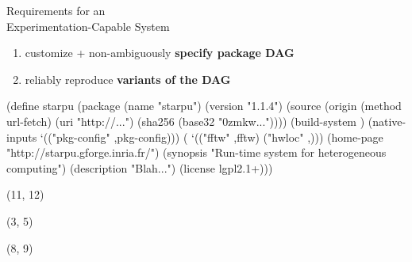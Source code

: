 \documentclass{beamer}
\newcommand{\highlight}[1]{\alert{\textbf{#1}}}
\begin{document}
\begin{frame}{Requirements for an\\Experimentation-Capable System}

  \Large{
    \begin{enumerate}
    \item customize + non-ambiguously \highlight{specify package DAG}
    \item reliably reproduce \highlight{variants of the DAG}
    \end{enumerate}
  }
\end{frame}

\begin{frame}[fragile]
  \begin{semiverbatim}
\small{
(define starpu
  (\alert{package}
    (name "starpu")
    (version "1.1.4")
    (source (origin
             (method url-fetch)
             (uri "http://\textrm{...}")
             (sha256 (base32 "0zmkw\textrm{...}"))))
    (\alert{build-system} )
    (native-inputs `(("pkg-config" ,pkg-config)))
    ( `(("fftw" ,fftw)
              ("hwloc" ,)))
    (home-page "http://starpu.gforge.inria.fr/")
    (synopsis "Run-time system for heterogeneous computing")
    (description "Blah...")
    (license lgpl2.1+)))
}
  \end{semiverbatim}

  \begin{textblock}{5}(11, 12)
  \end{textblock}


  \begin{textblock}{5}(3, 5)
  \end{textblock}

  \begin{textblock}{5}(8, 9)
  \end{textblock}

\end{frame}
\end{document}
